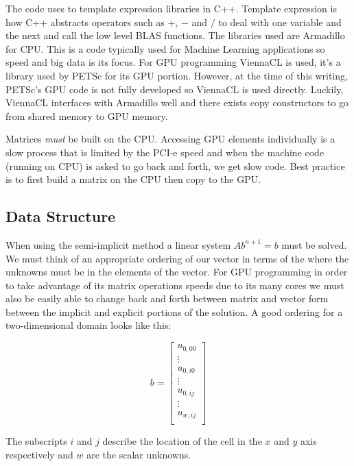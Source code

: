 \documentclass[12pt,upcase]{umlthesis}
\begin{document}
The code uses to template expression libraries in C++. Template expression is how C++ abstracts operators such as $+$, $-$ and $/$ to deal with one variable and the next and call the low level BLAS functions. The libraries used are Armadillo for CPU\@. This is a code typically used for Machine Learning applications so speed and big data is its focus. For GPU programming ViennaCL is used, it's a library used by PETSc for its GPU portion. However, at the time of this writing, PETSc's GPU code is not fully developed so ViennaCL is used directly. Luckily, ViennaCL interfaces with Armadillo well and there exists copy constructors to go from shared memory to GPU memory.

Matrices {\it must\/} be built on the CPU\@. Accessing GPU elements individually is a slow process that is limited by the PCI-e speed and when the machine code (running on CPU) is asked to go back and forth, we get slow code. Best practice is to first build a matrix on the CPU then copy to the GPU\@.

\subsection{Data Structure}\label{sec:datastructure}

When using the semi-implicit method a linear system $Ab^{n+1}=b$ must be solved. We must think of an appropriate ordering of our vector in terms of the where the unknowns must be in the elements of the vector. For GPU programming in order to take advantage of its matrix operations speeds due to its many cores we must also be easily able to change back and forth between matrix and vector form between the implicit and explicit portions of the solution. A good ordering for a two-dimensional domain looks like this:

\begin{equation}
	b =
\begin{bmatrix}
	u_{0,00} \\
	\vdots \\
	u_{0,i0} \\
	\vdots \\
	u_{0,ij} \\
	\vdots \\
	u_{w,ij} \\
\end{bmatrix}
\end{equation}

The subscripts $i$ and $j$ describe the location of the cell in the $x$ and $y$ axis respectively and $w$ are the scalar unknowns.
\end{document}
